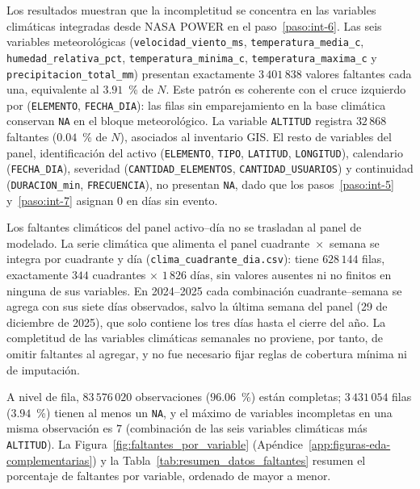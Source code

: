     Los resultados muestran que la incompletitud se concentra en las variables climáticas integradas desde NASA POWER en el paso~\ref{paso:int-6}. Las seis variables meteorológicas (\texttt{velocidad\_viento\_ms}, \texttt{temperatura\_media\_c}, \texttt{humedad\_relativa\_pct}, \texttt{temperatura\_minima\_c}, \texttt{temperatura\_maxima\_c} y \texttt{precipitacion\_total\_mm}) presentan exactamente $3\,401\,838$ valores faltantes cada una, equivalente al $3{.}91$~\% de $N$. Este patrón es coherente con el cruce izquierdo por (\texttt{ELEMENTO}, \texttt{FECHA\_DIA}): las filas sin emparejamiento en la base climática conservan \texttt{NA} en el bloque meteorológico. La variable \texttt{ALTITUD} registra $32\,868$ faltantes ($0{.}04$~\% de $N$), asociados al inventario GIS. El resto de variables del panel, identificación del activo (\texttt{ELEMENTO}, \texttt{TIPO}, \texttt{LATITUD}, \texttt{LONGITUD}), calendario (\texttt{FECHA\_DIA}), severidad (\texttt{CANTIDAD\_ELEMENTOS}, \texttt{CANTIDAD\_USUARIOS}) y continuidad (\texttt{DURACION\_min}, \texttt{FRECUENCIA}), no presentan \texttt{NA}, dado que los pasos~\ref{paso:int-5} y~\ref{paso:int-7} asignan $0$ en días sin evento.

    Los faltantes climáticos del panel activo--día no se trasladan al panel de modelado. La serie climática que alimenta el panel cuadrante~$\times$~semana se integra por cuadrante y día (\texttt{clima\_cuadrante\_dia.csv}): tiene $628\,144$ filas, exactamente $344$ cuadrantes $\times$ $1\,826$ días, sin valores ausentes ni no finitos en ninguna de sus variables. En 2024--2025 cada combinación cuadrante--semana se agrega con sus siete días observados, salvo la última semana del panel (29 de diciembre de 2025), que solo contiene los tres días hasta el cierre del año. La completitud de las variables climáticas semanales no proviene, por tanto, de omitir faltantes al agregar, y no fue necesario fijar reglas de cobertura mínima ni de imputación.
    
    A nivel de fila, $83\,576\,020$ observaciones ($96{.}06$~\%) están completas; $3\,431\,054$ filas ($3{.}94$~\%) tienen al menos un \texttt{NA}, y el máximo de variables incompletas en una misma observación es $7$ (combinación de las seis variables climáticas más \texttt{ALTITUD}). La Figura~\ref{fig:faltantes_por_variable} (Apéndice~\ref{app:figuras-eda-complementarias}) y la Tabla~\ref{tab:resumen_datos_faltantes} resumen el porcentaje de faltantes por variable, ordenado de mayor a menor.
    
